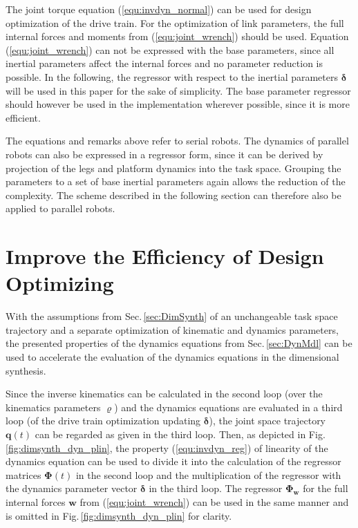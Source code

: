 \documentclass{svproc}
\newcommand{\bm}[1]{\boldsymbol{#1}}
\begin{document}
The joint torque equation (\ref{equ:invdyn_normal}) can be used for design optimization of the drive train.
For the optimization of link parameters, the full internal forces and moments from (\ref{equ:joint_wrench}) should be used.
Equation (\ref{equ:joint_wrench}) can not be expressed with the base parameters, since all inertial parameters affect the internal forces and no parameter reduction is possible.
In the following, the regressor with respect to the inertial parameters $\bm{\delta}$ will be used in this paper for the sake of simplicity.
The base parameter regressor should however be used in the implementation wherever possible, since it is more efficient.

The equations and remarks above refer to serial robots.
The dynamics of parallel robots can also be expressed in a regressor form, since it can be derived by projection of the legs and platform dynamics into the task space.
Grouping the parameters to a set of base inertial parameters again allows the reduction of the complexity.
The scheme described in the following section can therefore also be applied to parallel robots.

\newpage

\section{Improve the Efficiency of Design Optimizing}
\label{sec:DesOptImprove}

With the assumptions from Sec.\,\ref{sec:DimSynth} of an unchangeable task space trajectory and a separate optimization of kinematic and dynamics parameters, the presented properties of the dynamics equations from Sec.\,\ref{sec:DynMdl} can be used to accelerate the evaluation of the dynamics equations in the dimensional synthesis.

Since the inverse kinematics can be calculated in the second loop (over the kinematics parameters $\bm{\varrho}$) and the dynamics equations are evaluated in a third loop (of the drive train optimization updating $\bm{\delta}$), the joint space trajectory $\bm{q}(t)$ can be regarded as given in the third loop.
Then, as depicted in Fig.\,\ref{fig:dimsynth_dyn_plin}, the property (\ref{equ:invdyn_reg}) of linearity of the dynamics equation can be used to divide it into the calculation of the regressor matrices $\bm{\Phi}(t)$ in the second loop and the multiplication of the regressor with the dynamics parameter vector  $\bm{\delta}$ in the third loop.
The regressor $\bm{\Phi}_{\bm{w}}$ for the full internal forces $\bm{w}$ from (\ref{equ:joint_wrench}) can be used in the same manner and is omitted in Fig.\,\ref{fig:dimsynth_dyn_plin} for clarity.
\end{document}
